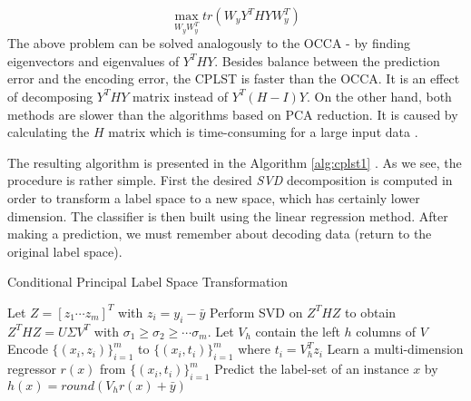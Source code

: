 \begin{equation}\label{eq:cplst6}
    \max_{W_yW_y^T} tr(W_yY^THYW_y^T)  
\end{equation}
The above problem can be solved analogously to the OCCA - by finding eigenvectors and eigenvalues of $Y^THY$. Besides balance between the prediction error and the encoding error, the CPLST is faster than the OCCA. It is an effect of decomposing $Y^THY$ matrix instead of $Y^T(H-I)Y$. On the other hand, both methods are slower than the algorithms based on PCA reduction. It is caused by calculating the $H$ matrix which is time-consuming for a large input data \cite{ChenLin}.

The resulting algorithm is presented in the Algorithm \ref{alg:cplst1} \cite{ChenLin}. As we see, the procedure is rather simple. First the desired \textit{SVD} decomposition is computed in order to transform a label space to a new space, which has certainly lower dimension. The classifier is then built using the linear regression method. After making a prediction, we must remember about decoding data (return to the original label space).  

\begin{algorithm}
    \caption{Conditional Principal Label Space Transformation}\label{alg:cplst1}
    \begin{algorithmic}[1]
        \State Let $Z=[z_1 \cdots z_m]^T$ with $z_i=y_i-\bar{y}$
        \State Perform SVD on $Z^THZ$ to obtain $Z^THZ=U\Sigma V^T$ with $\sigma_{1} \geq \sigma_{2} \geq \cdots \sigma_{m}$. Let $V_h$ contain the left $h$ columns of $V$
        \State Encode $\{(x_i,z_i)\}^{m}_{i=1}$ to $\{(x_i,t_i)\}^{m}_{i=1}$ where $t_i=V^T_hz_i$
        \State Learn a multi-dimension regressor $r(x)$ from $\{(x_i,t_i)\}^{m}_{i=1}$ 
        \State Predict the label-set of an instance $x$ by $h(x)=round(V_hr(x)+\bar{y})$  
    \end{algorithmic}
\end{algorithm}


